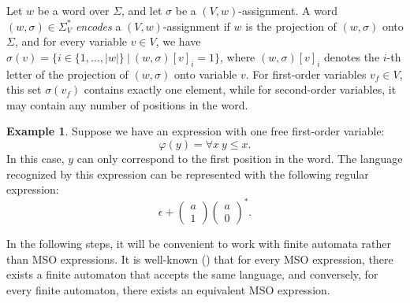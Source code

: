 \documentclass[12pt]{article}
\newcommand{\icol}[1]{%
  \left(\begin{smallmatrix}#1\end{smallmatrix}\right)%
}
\theoremstyle{definition}
\newtheorem{example}{Example}[section]
\begin{document}
Let $w$ be a word over $\Sigma$, and let $\sigma$ be a $(V, w)$-assignment. A word $(w, \sigma) \in \Sigma_V^*$ \emph{encodes} a $(V, w)$-assignment if $w$ is the projection of $(w, \sigma)$ onto $\Sigma$, and for every variable $v \in V$, we have $\sigma(v) = \{i \in \{1,\ldots,|w|\} \ | \ (w, \sigma)[v]_i = 1 \}$, where $(w, \sigma)[v]_i$ denotes the $i$-th letter of the projection of $(w, \sigma)$ onto variable $v$. For first-order variables $v_f \in V$, this set $\sigma(v_f)$ contains exactly one element, while for second-order variables, it may contain any number of positions in the word.

\begin{example}
    Suppose we have an expression with one free first-order variable:
    $$\varphi(y) = \forall x \ y \leq x.$$
    In this case, $y$ can only correspond to the first position in the word. The language recognized by this expression can be represented with the following regular expression: 
    $$\epsilon + \icol{a\\1}\icol{a\\0}^*.$$
\end{example}

In the following steps, it will be convenient to work with finite automata rather than MSO expressions. It is well-known (\cite{Buchi1960}) that for every MSO expression, there exists a finite automaton that accepts the same language, and conversely, for every finite automaton, there exists an equivalent MSO expression.
\end{document}
